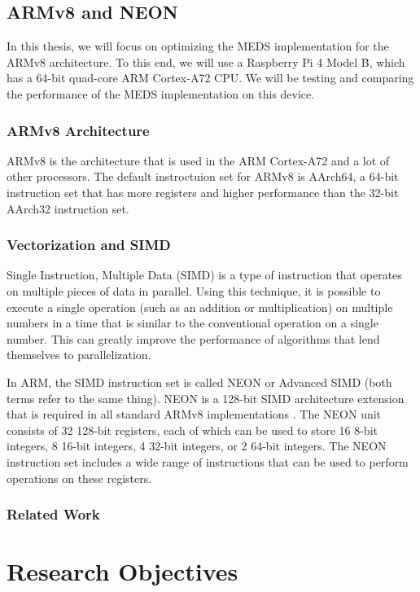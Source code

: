 \documentclass[11pt,a4paper]{report}
\begin{document}
\section{ARMv8 and NEON}
\label{sec:armv8}
In this thesis, we will focus on optimizing the MEDS implementation for the ARMv8 architecture. To this end, we will use a Raspberry Pi 4 Model B, which has a 64-bit quad-core ARM Cortex-A72 CPU. We will be testing and comparing the performance of the MEDS implementation on this device.

\subsection{ARMv8 Architecture}
ARMv8 is the architecture that is used in the ARM Cortex-A72 and a lot of other processors. The default instroctuion set for ARMv8 is AArch64, a 64-bit instruction set that has more registers and higher performance than the 32-bit AArch32 instruction set.

\subsection{Vectorization and SIMD}
Single Instruction, Multiple Data (SIMD) is a type of instruction that operates on multiple pieces of data in parallel. Using this technique, it is possible to execute a single operation (such as an addition or multiplication) on multiple numbers in a time that is similar to the conventional operation on a single number. This can greatly improve the performance of algorithms that lend themselves to parallelization.

In ARM, the SIMD instruction set is called NEON or Advanced SIMD (both terms refer to the same thing). NEON is a 128-bit SIMD architecture extension that is required in all standard ARMv8 implementations \cite{ARMv8A-ProgrammersGuide}. The NEON unit consists of 32 128-bit registers, each of which can be used to store 16 8-bit integers, 8 16-bit integers, 4 32-bit integers, or 2 64-bit integers. The NEON instruction set includes a wide range of instructions that can be used to perform operations on these registers.

\subsection{Related Work}

\chapter{Research Objectives}
\label{ch:researchobjectives}
\end{document}
